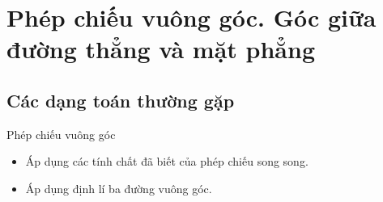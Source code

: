 \setcounter{dang}{0}
\section{Phép chiếu vuông góc. Góc giữa đường thẳng và mặt phẳng}
\subsection{Các dạng toán thường gặp}

\begin{dang}{Phép chiếu vuông góc}
	\begin{itemize}
		\item Áp dụng các tính chất đã biết của phép chiếu song song.
		\item Áp dụng định lí ba đường vuông góc.
	\end{itemize}
\end{dang}

